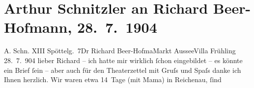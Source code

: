 

         
         \newcommand{\erwaehntePersonen}{Personen: Richard Beer-Hofmann, Felix Salten, Louise Schnitzler}
         \newcommand{\erwaehnteInstitutionen}{}
         \newcommand{\erwaehnteOrte}{Orte: Bad Aussee, Bad Ischl, Edmund-Weiß-Gasse, I., Innere Stadt, Nasswald, Reichenau an der Rax, Villa Frühling, Wien}
         \newcommand{\erwaehnteWerke}{Werke: Der Graf von Charolais. Ein Trauerspiel}
               \section[Arthur Schnitzler an Richard Beer-Hofmann, 28. 7. 1904]{ Arthur Schnitzler an Richard Beer-Hofmann, 28. 7. 1904}\nopagebreak{}\rehead{ }\begin{ledgroupsized}[t]{13cm}\normalsize\beginnumbering \toendnotes[C]{\smallbreak\pagebreak[2]} 
\toendnotes[C]{\smallbreak}\pstart{}{\pb}A. Schn. XIII Spöttelg. 7\pend{}{\bigskip}\pstart{}{\pb}Dr Richard Beer-Hofma{\geminationn}\pend{}\pstart{}Markt Aussee\pend{}\pstart{}Villa Frühling\pend{}{\bigskip}\pstart
           \raggedleft{}{\pb}28. 7. 904\pend
           \pstart
           lieber Richard – ich hatte mir wirklich ſchon eingebildet – es
               könnte ein Brief ſein – aber auch für den Theaterzettel mit Gruſs und Spaſs danke ich
               Ihnen herzlich. Wir waren etwa 14 Tage \introOben{}(\introOben{}mit Mama\introOben{})\introOben{} in Reichenau, ſind

\end{ledgroupsized}
